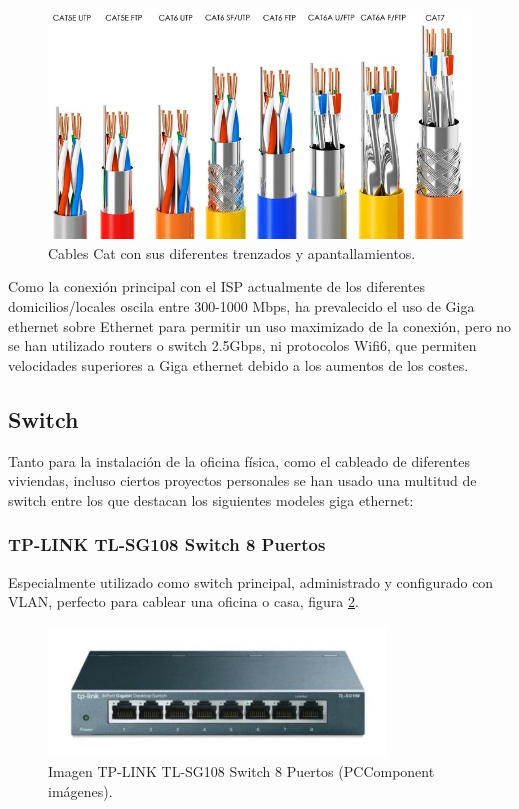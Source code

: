 \begin{figure}[!htb]
\begin{center}
\includegraphics[width=1\textwidth]{./figuras/cables_cat}
\caption{Cables Cat con sus diferentes trenzados y apantallamientos\cite{i_cables}.}
\label{F:cables_cat}
\end{center}
\end{figure}

Como la conexión principal con el ISP actualmente de los diferentes domicilios/locales oscila entre 300-1000 Mbps, ha prevalecido el uso de Giga ethernet sobre Ethernet para permitir un uso maximizado de la conexión, pero no se han utilizado routers o switch 2.5Gbps, ni protocolos Wifi6, que permiten velocidades superiores a Giga ethernet debido a los aumentos de los costes. 

\subsection{Switch}
Tanto para la instalación de la oficina física, como el cableado de diferentes viviendas, incluso ciertos proyectos personales se han usado una multitud de switch entre los que destacan los siguientes modeles giga ethernet:

\subsubsection{TP-LINK TL-SG108 Switch 8 Puertos}
Especialmente utilizado como switch principal, administrado y configurado con VLAN, perfecto para cablear una oficina o casa, figura \ref{F:giga_switch_8p}.
\begin{figure}[htbp]
\begin{center}
\includegraphics[width=0.8\textwidth]{./figuras/giga_switch_8p}
\caption{Imagen TP-LINK TL-SG108 Switch 8 Puertos (PCComponent imágenes).}
\label{F:giga_switch_8p}
\end{center}
\end{figure}

